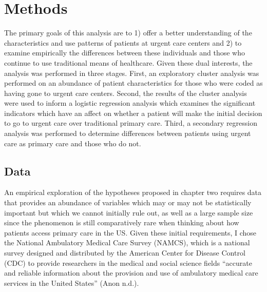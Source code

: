 \documentclass[12pt,twoside]{reedthesis}
\begin{document}
  \chapter*{Methods}\label{methods}
  
  \setcounter{chapter}{4} \setcounter{section}{0} \doublespacing
  
  The primary goals of this analysis are to 1) offer a better
  understanding of the characteristics and use patterns of patients at
  urgent care centers and 2) to examine empirically the differences
  between these individuals and those who continue to use traditional
  means of healthcare. Given these dual interests, the analysis was
  performed in three stages. First, an exploratory cluster analysis was
  performed on an abundance of patient characteristics for those who were
  coded as having gone to urgent care centers. Second, the results of the
  cluster analysis were used to inform a logistic regression analysis
  which examines the significant indicators which have an affect on
  whether a patient will make the initial decision to go to urgent care
  over traditional primary care. Third, a secondary regression analysis
  was performed to determine differences between patients using urgent
  care as primary care and those who do not.
  
  \section*{Data}\label{data}
  
  An empirical exploration of the hypotheses proposed in chapter two
  requires data that provides an abundance of variables which may or may
  not be statistically important but which we cannot initially rule out,
  as well as a large sample size since the phenomenon is still
  comparatively rare when thinking about how patients access primary care
  in the US. Given these initial requirements, I chose the National
  Ambulatory Medical Care Survey (NAMCS), which is a national survey
  designed and distributed by the American Center for Disease Control
  (CDC) to provide researchers in the medical and social science fields
  ``accurate and reliable information about the provision and use of
  ambulatory medical care services in the United States'' (Anon n.d.).
  
\end{document}
